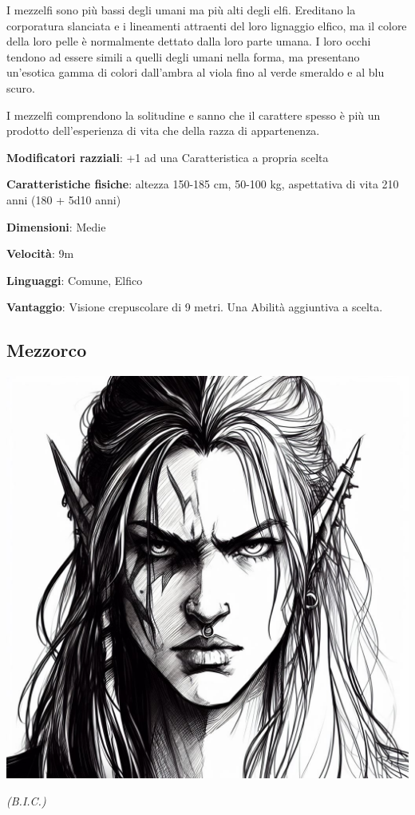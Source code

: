 \begin{multicols}{2}
I mezzelfi sono più bassi degli umani ma più alti degli elfi. Ereditano la corporatura slanciata e i lineamenti attraenti del loro lignaggio elfico, ma il colore della loro pelle è normalmente dettato dalla loro parte umana. I loro occhi tendono ad essere simili a quelli degli umani nella forma, ma presentano un'esotica gamma di colori dall'ambra al viola fino al verde smeraldo e al blu scuro.

I mezzelfi comprendono la solitudine e sanno che il carattere spesso è più un prodotto dell'esperienza di vita che della razza di appartenenza. 

\textbf{Modificatori razziali}: +1 ad una Caratteristica a propria scelta

\textbf{Caratteristiche fisiche}: altezza 150-185 cm, 50-100 kg, aspettativa di vita 210 anni (180 + 5d10 anni)

\textbf{Dimensioni}: Medie

\textbf{Velocità}: 9m

\textbf{Linguaggi}: Comune, Elfico

\textbf{Vantaggio}: Visione crepuscolare di 9 metri. Una Abilità aggiuntiva a scelta.



\subsection{Mezzorco}\label{mezzorco}

\begin{center}
\includegraphics[height=0.7\linewidth]{immagini/half-orc2-ai.png}

\textit{(B.I.C.)}
\end{center}



\end{multicols}
